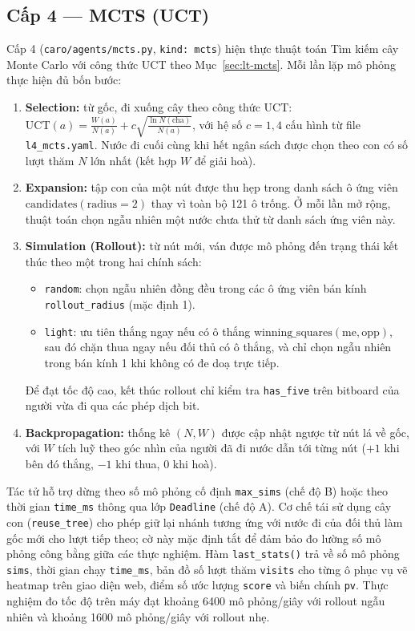 \subsection{Cấp 4 --- MCTS (UCT)}
Cấp 4 (\texttt{caro/agents/mcts.py}, \texttt{kind: mcts}) hiện thực thuật toán Tìm kiếm cây Monte Carlo với công thức UCT theo Mục~\ref{sec:lt-mcts}.
Mỗi lần lặp mô phỏng thực hiện đủ bốn bước:
\begin{enumerate}
  \item \textbf{Selection:} từ gốc, đi xuống cây theo công thức UCT: $\text{UCT}(a) = \frac{W(a)}{N(a)} + c \sqrt{\frac{\ln N(\text{cha})}{N(a)}}$, với hệ số $c = 1{,}4$ cấu hình từ file \texttt{l4\_mcts.yaml}. Nước đi cuối cùng khi hết ngân sách được chọn theo con có số lượt thăm $N$ lớn nhất (kết hợp $W$ để giải hoà).
  \item \textbf{Expansion:} tập con của một nút được thu hẹp trong danh sách ô ứng viên $\text{candidates}(\text{radius}=2)$ thay vì toàn bộ 121 ô trống. Ở mỗi lần mở rộng, thuật toán chọn ngẫu nhiên một nước chưa thử từ danh sách ứng viên này.
  \item \textbf{Simulation (Rollout):} từ nút mới, ván được mô phỏng đến trạng thái kết thúc theo một trong hai chính sách:
  \begin{itemize}
    \item \texttt{random}: chọn ngẫu nhiên đồng đều trong các ô ứng viên bán kính \texttt{rollout\_radius} (mặc định 1).
    \item \texttt{light}: ưu tiên thắng ngay nếu có ô thắng $\text{winning\_squares}(\text{me}, \text{opp})$, sau đó chặn thua ngay nếu đối thủ có ô thắng, và chỉ chọn ngẫu nhiên trong bán kính 1 khi không có đe doạ trực tiếp.
  \end{itemize}
  Để đạt tốc độ cao, kết thúc rollout chỉ kiểm tra \texttt{has\_five} trên bitboard của người vừa đi qua các phép dịch bit.
  \item \textbf{Backpropagation:} thống kê $(N, W)$ được cập nhật ngược từ nút lá về gốc, với $W$ tích luỹ theo góc nhìn của người đã đi nước dẫn tới từng nút ($+1$ khi bên đó thắng, $-1$ khi thua, $0$ khi hoà).
\end{enumerate}
Tác tử hỗ trợ dừng theo số mô phỏng cố định \texttt{max\_sims} (chế độ B) hoặc theo thời gian \texttt{time\_ms} thông qua lớp \texttt{Deadline} (chế độ A).
Cơ chế tái sử dụng cây con (\texttt{reuse\_tree}) cho phép giữ lại nhánh tương ứng với nước đi của đối thủ làm gốc mới cho lượt tiếp theo; cờ này mặc định tắt để đảm bảo đo lường số mô phỏng công bằng giữa các thực nghiệm.
Hàm \texttt{last\_stats()} trả về số mô phỏng \texttt{sims}, thời gian chạy \texttt{time\_ms}, bản đồ số lượt thăm \texttt{visits} cho từng ô phục vụ vẽ heatmap trên giao diện web, điểm số ước lượng \texttt{score} và biến chính \texttt{pv}.
Thực nghiệm đo tốc độ trên máy đạt khoảng \num{6400} mô phỏng/giây với rollout ngẫu nhiên và khoảng \num{1600} mô phỏng/giây với rollout nhẹ.
